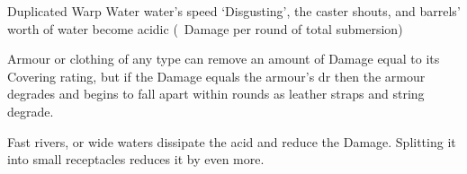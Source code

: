   {Duplicated}%
  {Warp}%
  {Water}%
  {water's speed}%
  {`Disgusting', the caster shouts, and  barrels' worth of water become acidic (\showDam~Damage per round of total submersion)}%
  {
    Armour or clothing of any type can remove an amount of Damage equal to its Covering rating, but if the Damage equals the armour's \gls{dr} then the armour degrades and begins to fall apart within  rounds as leather straps and string degrade.

    Fast rivers, or wide waters dissipate the acid and reduce the Damage.
	Splitting it into small receptacles reduces it by even more.
  }

